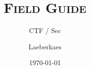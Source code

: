 \documentclass[a4paper,DIV=calc,11pt]{scrartcl}
\begin{document}

\onehalfspace %

\title{\textsc{Field Guide}}
\subtitle{CTF / Sec}
\date{\small \today}
\author{Laeberkaes}
\maketitle %

\tableofcontents
\newpage










\end{document}
